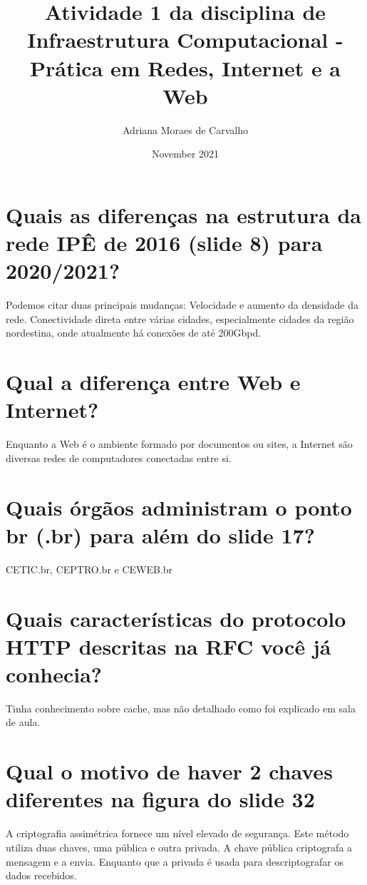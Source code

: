 \documentclass{article}
\title{Atividade 1 da disciplina de Infraestrutura Computacional - Prática em Redes, Internet e a Web}
\author{Adriana Moraes de Carvalho}
\date{November 2021}
\begin{document}
\maketitle

\section{Quais as diferenças na estrutura da rede IPÊ de 2016 (slide 8) para 2020/2021?}
 Podemos citar duas principais mudanças: Velocidade e aumento da densidade da rede. Conectividade direta entre várias cidades, especialmente cidades da região nordestina, onde atualmente há conexões de até 200Gbpd.


\section{Qual a diferença entre Web e Internet?}
Enquanto a Web é o ambiente formado por documentos ou sites, a
Internet são diversas redes de computadores conectadas entre si.

\section{Quais órgãos administram o ponto br (.br) para além do slide 17?}
 CETIC.br, CEPTRO.br e CEWEB.br 

\section{Quais características do protocolo HTTP descritas na RFC você já conhecia?}
Tinha conhecimento sobre cache, mas não detalhado como foi explicado em sala de aula.

\section{Qual o motivo de haver 2 chaves diferentes na figura do slide 32}
A criptografia assimétrica fornece um nível elevado de segurança. Este método utiliza duas chaves, uma pública e outra privada. A chave pública criptografa a mensagem e a envia. Enquanto que a privada é usada para descriptografar os dados recebidos.
\end{document}
